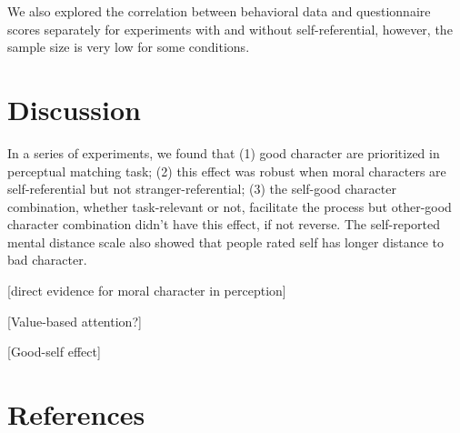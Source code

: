 \documentclass[
  english,
  man]{apa6}
\begin{document}
We also explored the correlation between behavioral data and questionnaire scores separately for experiments with and without self-referential, however, the sample size is very low for some conditions.

\hypertarget{discussion}{%
\section{Discussion}\label{discussion}}

In a series of experiments, we found that (1) good character are prioritized in perceptual matching task; (2) this effect was robust when moral characters are self-referential but not stranger-referential; (3) the self-good character combination, whether task-relevant or not, facilitate the process but other-good character combination didn't have this effect, if not reverse. The self-reported mental distance scale also showed that people rated self has longer distance to bad character.

{[}direct evidence for moral character in perception{]}

{[}Value-based attention?{]}

{[}Good-self effect{]}

\hypertarget{references}{%
\section{References}\label{references}}

\begingroup
\setlength{\parindent}{-0.5in}
\setlength{\leftskip}{0.5in}
\end{document}
